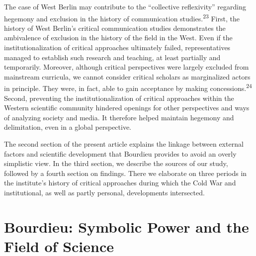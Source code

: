 \documentclass{tufte-handout}
\begin{document}
The case of West Berlin may contribute to the ``collective reflexivity''
regarding hegemony and exclusion in the history of communication
studies.\textsuperscript{23} First, the history of West Berlin's critical
communication studies demonstrates the ambivalence of exclusion in the
history of the field in the West. Even if the institutionalization of
critical approaches ultimately failed, representatives managed to
establish such research and teaching, at least partially and
temporarily. Moreover, although critical perspectives were largely
excluded from mainstream curricula, we cannot consider critical scholars
as marginalized actors in principle. They were, in fact, able to gain
acceptance by making concessions.\textsuperscript{24} Second, preventing the institutionalization of critical
approaches within the Western scientific community hindered openings for
other perspectives and ways of analyzing society and media. It therefore
helped maintain hegemony and delimitation, even in a global perspective.

The second section of the present article explains the linkage between
external factors and scientific development that Bourdieu provides to
avoid an overly simplistic view. In the third section, we describe the
sources of our study, followed by a fourth section on findings. There we
elaborate on three periods in the institute's history of critical
approaches during which the Cold War and institutional, as well as
partly personal, developments intersected.

\hypertarget{bourdieu-symbolic-power-and-the-field-of-science}{%
\section{Bourdieu: Symbolic Power and the Field of
Science}\label{bourdieu-symbolic-power-and-the-field-of-science}}
\end{document}
